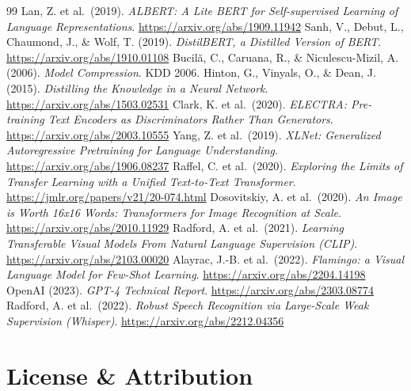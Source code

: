 \begin{vbframe}
{\begin{thebibliography}{99}
 Lan, Z. et al.\ (2019). \textit{ALBERT: A Lite BERT for Self-supervised Learning of Language Representations}. \url{https://arxiv.org/abs/1909.11942}
 Sanh, V., Debut, L., Chaumond, J., \& Wolf, T. (2019). \textit{DistilBERT, a Distilled Version of BERT}. \url{https://arxiv.org/abs/1910.01108}
 Bucil\u{a}, C., Caruana, R., \& Niculescu-Mizil, A. (2006). \textit{Model Compression}. KDD 2006.
 Hinton, G., Vinyals, O., \& Dean, J. (2015). \textit{Distilling the Knowledge in a Neural Network}. \url{https://arxiv.org/abs/1503.02531}
 Clark, K. et al.\ (2020). \textit{ELECTRA: Pre-training Text Encoders as Discriminators Rather Than Generators}. \url{https://arxiv.org/abs/2003.10555}
 Yang, Z. et al.\ (2019). \textit{XLNet: Generalized Autoregressive Pretraining for Language Understanding}. \url{https://arxiv.org/abs/1906.08237}
 Raffel, C. et al.\ (2020). \textit{Exploring the Limits of Transfer Learning with a Unified Text-to-Text Transformer}. \url{https://jmlr.org/papers/v21/20-074.html}
 Dosovitskiy, A. et al.\ (2020). \textit{An Image is Worth 16x16 Words: Transformers for Image Recognition at Scale}. \url{https://arxiv.org/abs/2010.11929}
 Radford, A. et al.\ (2021). \textit{Learning Transferable Visual Models From Natural Language Supervision (CLIP)}. \url{https://arxiv.org/abs/2103.00020}
 Alayrac, J.-B. et al.\ (2022). \textit{Flamingo: a Visual Language Model for Few-Shot Learning}. \url{https://arxiv.org/abs/2204.14198}
 OpenAI (2023). \textit{GPT-4 Technical Report}. \url{https://arxiv.org/abs/2303.08774}
 Radford, A. et al.\ (2022). \textit{Robust Speech Recognition via Large-Scale Weak Supervision (Whisper)}. \url{https://arxiv.org/abs/2212.04356}
\end{thebibliography}
}
\end{vbframe}

\section{License \& Attribution}

